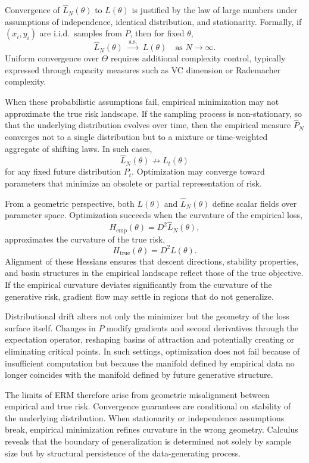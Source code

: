 \documentclass[12pt]{book}
\begin{document}
Convergence of $\hat{L}_N(\theta)$ to $L(\theta)$ is justified by the law of large numbers under assumptions of independence, identical distribution, and stationarity. Formally, if $(x_i,y_i)$ are i.i.d.\ samples from $P$, then for fixed $\theta$,
\[
\hat{L}_N(\theta)
\;\xrightarrow{\,\text{a.s.}\,}\;
L(\theta)
\quad \text{as } N \to \infty.
\]
Uniform convergence over $\Theta$ requires additional complexity control, typically expressed through capacity measures such as VC dimension or Rademacher complexity.

When these probabilistic assumptions fail, empirical minimization may not approximate the true risk landscape. If the sampling process is non-stationary, so that the underlying distribution evolves over time, then the empirical measure $\hat{P}_N$ converges not to a single distribution but to a mixture or time-weighted aggregate of shifting laws. In such cases,
\[
\hat{L}_N(\theta)
\not\to
L_t(\theta)
\]
for any fixed future distribution $P_t$. Optimization may converge toward parameters that minimize an obsolete or partial representation of risk.

From a geometric perspective, both $L(\theta)$ and $\hat{L}_N(\theta)$ define scalar fields over parameter space. Optimization succeeds when the curvature of the empirical loss,
\[
H_{\text{emp}}(\theta) = D^2 \hat{L}_N(\theta),
\]
approximates the curvature of the true risk,
\[
H_{\text{true}}(\theta) = D^2 L(\theta).
\]
Alignment of these Hessians ensures that descent directions, stability properties, and basin structures in the empirical landscape reflect those of the true objective. If the empirical curvature deviates significantly from the curvature of the generative risk, gradient flow may settle in regions that do not generalize.

Distributional drift alters not only the minimizer but the geometry of the loss surface itself. Changes in $P$ modify gradients and second derivatives through the expectation operator, reshaping basins of attraction and potentially creating or eliminating critical points. In such settings, optimization does not fail because of insufficient computation but because the manifold defined by empirical data no longer coincides with the manifold defined by future generative structure.

The limits of ERM therefore arise from geometric misalignment between empirical and true risk. Convergence guarantees are conditional on stability of the underlying distribution. When stationarity or independence assumptions break, empirical minimization refines curvature in the wrong geometry. Calculus reveals that the boundary of generalization is determined not solely by sample size but by structural persistence of the data-generating process.
\end{document}
